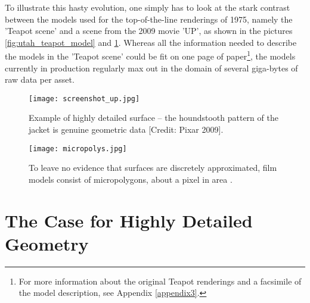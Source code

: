 To illustrate this hasty evolution, one simply has to look at the stark contrast between the models used for the top-of-the-line renderings of 1975, namely the 'Teapot scene' and a scene from the 2009 movie 'UP', as shown in the pictures \ref{fig:utah_teapot_model} and \ref{fig:micropolys}.
Whereas all the information needed to describe the models in the 'Teapot scene' could be fit on one page of paper\footnote{  For more information about the original Teapot renderings and a facsimile of the model description, see Appendix \ref{appendix3}.}, the models currently in production regularly max out in the domain of several giga-bytes of raw data per asset.
\begin{figure}[ht]
\begin{minipage}[b]{0.475\linewidth} \centering
\texttt{[image: screenshot\_up.jpg]}
\caption{Example of highly detailed surface -- the houndstooth pattern of the jacket is genuine geometric data {[}Credit: Pixar 2009{]}.}
\label{fig:screenshot_up}
\end{minipage}
\hspace{0.35cm}
\begin{minipage}[b]{0.475\linewidth}
\centering
\texttt{[image: micropolys.jpg]}
\caption{To leave no evidence that surfaces are discretely approximated, film models consist of micropolygons, about a pixel in area \citep[][p.7]{Fatahalian2011}.}
\label{fig:micropolys}
\end{minipage}
\end{figure}

\section{The Case for Highly Detailed Geometry}
\label{introduction2}

